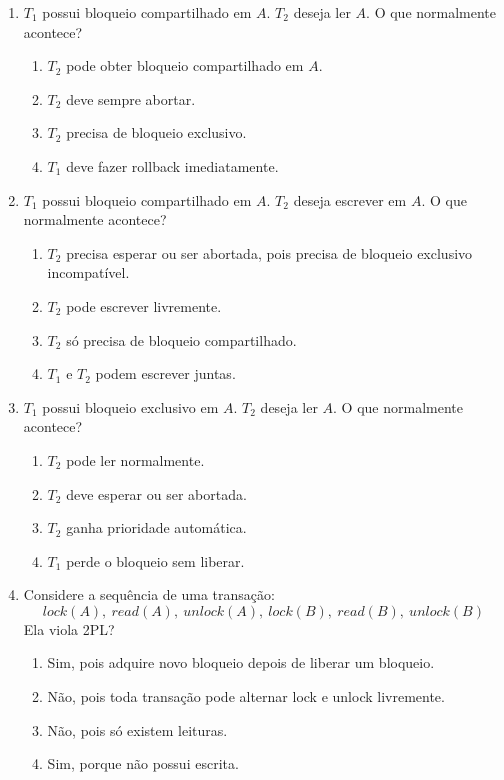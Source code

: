 \documentclass[12pt,a4paper]{article}
\begin{document}
\begin{enumerate}[resume,label=\textbf{Q\arabic*.}]

\item $T_1$ possui bloqueio compartilhado em $A$. $T_2$ deseja ler $A$. O que normalmente acontece?

\begin{enumerate}[label=\alph*)]
    \item $T_2$ pode obter bloqueio compartilhado em $A$.
    \item $T_2$ deve sempre abortar.
    \item $T_2$ precisa de bloqueio exclusivo.
    \item $T_1$ deve fazer rollback imediatamente.
\end{enumerate}

\item $T_1$ possui bloqueio compartilhado em $A$. $T_2$ deseja escrever em $A$. O que normalmente acontece?

\begin{enumerate}[label=\alph*)]
    \item $T_2$ precisa esperar ou ser abortada, pois precisa de bloqueio exclusivo incompatível.
    \item $T_2$ pode escrever livremente.
    \item $T_2$ só precisa de bloqueio compartilhado.
    \item $T_1$ e $T_2$ podem escrever juntas.
\end{enumerate}

\item $T_1$ possui bloqueio exclusivo em $A$. $T_2$ deseja ler $A$. O que normalmente acontece?

\begin{enumerate}[label=\alph*)]
    \item $T_2$ pode ler normalmente.
    \item $T_2$ deve esperar ou ser abortada.
    \item $T_2$ ganha prioridade automática.
    \item $T_1$ perde o bloqueio sem liberar.
\end{enumerate}

\item Considere a sequência de uma transação:
\[
lock(A),\ read(A),\ unlock(A),\ lock(B),\ read(B),\ unlock(B)
\]
Ela viola 2PL?

\begin{enumerate}[label=\alph*)]
    \item Sim, pois adquire novo bloqueio depois de liberar um bloqueio.
    \item Não, pois toda transação pode alternar lock e unlock livremente.
    \item Não, pois só existem leituras.
    \item Sim, porque não possui escrita.
\end{enumerate}


\end{enumerate}
\end{document}
